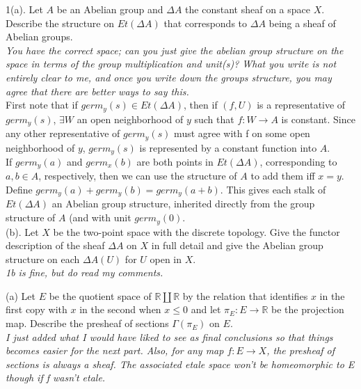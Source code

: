 1(a). Let $A$ be an Abelian group and $\Delta A$ the constant sheaf on a space $X$. Describe the structure on $Et(\Delta A)$ that corresponds to $\Delta A$ being a sheaf of Abelian groups. \\


\textit{You have the correct space; can you just give the abelian group structure on the space in terms of the group multiplication and unit(s)? What you write is not entirely clear to me, and once you write down the groups structure, you may agree that there are better ways to say this.}\\
  
First note that if $germ_y(s) \in Et(\Delta A)$, then if $(f,U)$ is a representative of $germ_y(s)$, $\exists W$ an open neighborhood of $y$ such that $f:W \rightarrow A$ is constant. Since any other representative of $germ_y(s)$ must agree with f on some open neighborhood of $y$, $germ_y(s)$ is represented by a constant function into $A$. \\

If $germ_y(a)$ and $germ_x(b)$ are both points in $Et(\Delta A)$, corresponding to $a,b \in A$, respectively, then we can use the structure of $A$ to add them iff $x=y$. Define $germ_y(a) + germ_y(b) = germ_y(a+b)$. This gives each stalk of $Et(\Delta A)$ an Abelian group structure, inherited directly from the group structure of $A$ (and with unit $germ_y(0)$.\\
  
  
(b). Let $X$ be the two-point space with the discrete topology. Give the functor description of the sheaf $\Delta A$ on $X$ in full detail and give the Abelian group structure on each $\Delta A(U)$ for $U$ open in $X$.\\

 \textit{1b is fine, but do read my comments.}

(a)  Let $E$ be the quotient space of $\mathbb{R} \amalg \mathbb{R}$ by the relation that identifies $x$ in the first copy with $x$ in the second when $x \leq 0$ and let $\pi_E: E \rightarrow \mathbb{R}$ be the projection map. Describe the presheaf of sections $\Gamma (\pi_E)$ on $E$.\\

\textit{I just added what I would have liked to see as final conclusions so that things becomes easier for the next part. Also, for any map $f:E \rightarrow X$, the presheaf of sections is always a sheaf. The associated etale space won't be homeomorphic to E though if f wasn't etale.}\\

